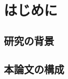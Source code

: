 \chapter{はじめに} %
\label{sec:はじめに}
\section{研究の背景}  %
\label{sec:研究の背景}

\section{本論文の構成}
\label{sec:本論文の構成}

